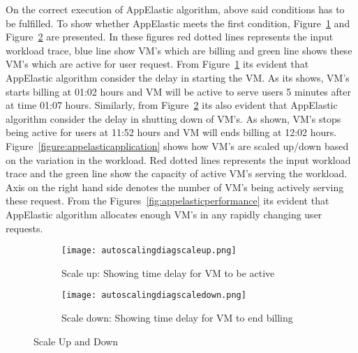 On the correct execution of AppElastic algorithm, above said conditions has to be fulfilled. To show whether AppElastic meets the first condition, Figure~\ref{figure:billingactivescaleup} and Figure~\ref{figure:billingactivescaledown} are presented. In these figures red dotted lines represents the input workload trace, blue line show VM's which are billing and green line shows these VM's which are active for user request. From Figure~\ref{figure:billingactivescaleup} its evident that AppElastic algorithm consider the delay in starting the VM. As its shows, VM's starts billing at 01:02 hours and VM will be active to serve users 5 minutes after at time 01:07 hours. Similarly, from Figure~\ref{figure:billingactivescaledown} its also evident that AppElastic algorithm consider the delay in shutting down of VM's. As shown, VM's stops being active for users at 11:52 hours and VM will ends billing at 12:02 hours.
\\
Figure~\ref{figure:appelasticapplication} shows how VM's are scaled up/down based on the variation in the workload. Red dotted lines represents the input workload trace and the green line show the capacity of active VM's serving the workload. Axis on the right hand side denotes the number of VM's being actively serving these request. From the Figures~\ref{fig:appelasticperformance} its evident that AppElastic algorithm allocates enough VM's in any rapidly changing user requests.
\begin{figure}
     \centering
     \begin{subfigure}[b]{1.0\textwidth}
         \texttt{[image: autoscalingdiagscaleup.png]}
         \caption{Scale up: Showing time delay for VM to be active}
         \label{figure:billingactivescaleup}
     \end{subfigure}
     \begin{subfigure}[b]{0.9\textwidth}
         \texttt{[image: autoscalingdiagscaledown.png]}
         \caption{Scale down: Showing time delay for VM to end billing}
         \label{figure:billingactivescaledown}
     \end{subfigure}
     \caption{Scale Up and Down}
     \label{fig:billingactive}
\end{figure}

